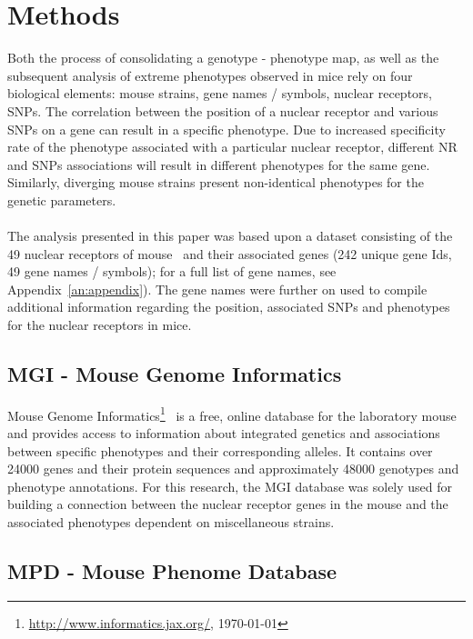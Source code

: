\documentclass[fleqn,11pt]{SelfArx}
\begin{document}

\section{Methods}

Both the process of consolidating a genotype - phenotype map, as well as the subsequent analysis of extreme phenotypes observed in mice rely on four biological elements: mouse strains, gene names / symbols, nuclear receptors, SNPs. The correlation between the position of a nuclear receptor and various SNPs on a gene can result in a specific phenotype. Due to increased specificity rate of the phenotype associated with a particular nuclear receptor, different NR and SNPs associations will result in different phenotypes for the same gene. Similarly, diverging mouse strains present non-identical phenotypes for the genetic parameters.  
~~~~~~~\\
~~~~~~~\\  
The analysis presented in this paper was based upon a dataset consisting of the 49 nuclear receptors of mouse~\cite{proteomic} and their associated genes (242 unique gene Ids, 49 gene names / symbols); for a full list of gene names, see Appendix~\ref{an:appendix}). The gene names were further on used to compile additional information regarding the position, associated SNPs and phenotypes for the nuclear receptors in mice.

\subsection{MGI - Mouse Genome Informatics}

Mouse Genome Informatics\footnote{\url{http://www.informatics.jax.org/}, \today}~\cite{mgi} is a free, online database for the laboratory mouse and provides access to information about integrated genetics and associations between specific phenotypes and their corresponding alleles. It contains over 24000 genes and their protein sequences and approximately 48000 genotypes and phenotype annotations. For this research, the MGI database was solely used for building a connection between the nuclear receptor genes in the mouse and the associated phenotypes dependent on miscellaneous strains. 

\subsection{MPD - Mouse Phenome Database}
\end{document}
